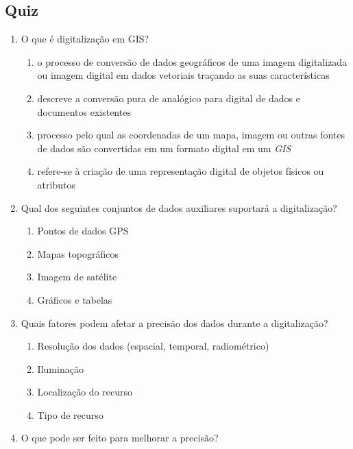 \documentclass[
]{krantz}
\begin{document}
\hypertarget{quiz-17}{%
\subsection{Quiz}\label{quiz-17}}

\begin{enumerate}
\def\labelenumi{\arabic{enumi}.}
\item
  O que é digitalização em GIS?

  \begin{enumerate}
  \def\labelenumii{\alph{enumii}.}
  \item
    o processo de conversão de dados geográficos de uma imagem digitalizada ou imagem digital em dados vetoriais traçando as suas características
  \item
    descreve a conversão pura de analógico para digital de dados e documentos existentes
  \item
    processo pelo qual as coordenadas de um mapa, imagem ou outras fontes de dados são convertidas em um formato digital em um \emph{GIS}
  \item
    refere-se à criação de uma representação digital de objetos físicos ou atributos
  \end{enumerate}
\item
  Qual dos seguintes conjuntos de dados auxiliares suportará a digitalização?

  \begin{enumerate}
  \def\labelenumii{\alph{enumii}.}
  \item
    Pontos de dados GPS
  \item
    Mapas topográficos
  \item
    Imagem de satélite
  \item
    Gráficos e tabelas
  \end{enumerate}
\item
  Quais fatores podem afetar a precisão dos dados durante a digitalização?

  \begin{enumerate}
  \def\labelenumii{\alph{enumii}.}
  \item
    Resolução dos dados (espacial, temporal, radiométrico)
  \item
    Iluminação
  \item
    Localização do recurso
  \item
    Tipo de recurso
  \end{enumerate}
\item
  O que pode ser feito para melhorar a precisão?


\end{enumerate}
\end{document}

